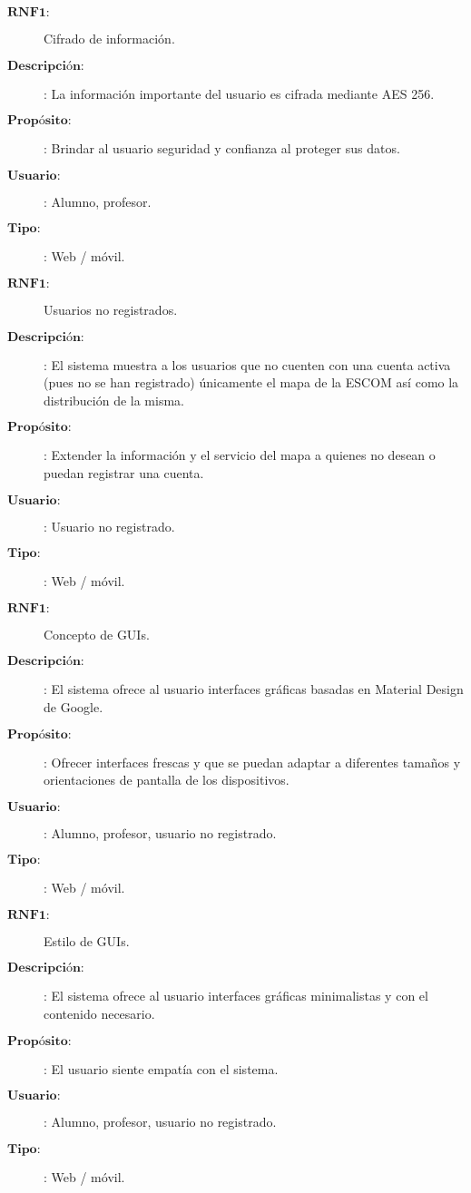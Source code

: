 \begin{description}
\item[$\textbf{RNF1:}$] Cifrado de información. 
\item[$\textbf{Descripción:}$]: La información importante del usuario es cifrada mediante AES 256.
\item[$\textbf{Propósito:}$]: Brindar al usuario seguridad y confianza al proteger sus datos. 
\item[$\textbf{Usuario:}$]: Alumno, profesor.
\item[$\textbf{Tipo:}$]: Web / móvil. \\

\item[$\textbf{RNF1:}$] Usuarios no registrados. 
\item[$\textbf{Descripción:}$]: El sistema muestra a los usuarios que no cuenten con una cuenta activa (pues no se han registrado) únicamente el mapa de la ESCOM así como la distribución de la misma.
\item[$\textbf{Propósito:}$]: Extender la información y el servicio del mapa a quienes no desean o puedan registrar una cuenta.
\item[$\textbf{Usuario:}$]: Usuario no registrado.  
\item[$\textbf{Tipo:}$]: Web / móvil. \\

\item[$\textbf{RNF1:}$] Concepto de GUIs. 
\item[$\textbf{Descripción:}$]: El sistema ofrece al usuario interfaces gráficas basadas en Material Design de Google.
\item[$\textbf{Propósito:}$]: Ofrecer interfaces frescas y que se puedan adaptar a diferentes tamaños y orientaciones de pantalla de los dispositivos. 
\item[$\textbf{Usuario:}$]: Alumno, profesor, usuario no registrado.  
\item[$\textbf{Tipo:}$]: Web / móvil. \\

\item[$\textbf{RNF1:}$] Estilo de GUIs. 
\item[$\textbf{Descripción:}$]: El sistema ofrece al usuario interfaces gráficas minimalistas y con el contenido necesario.
\item[$\textbf{Propósito:}$]: El usuario siente empatía con el sistema. 
\item[$\textbf{Usuario:}$]: Alumno, profesor, usuario no registrado.  
\item[$\textbf{Tipo:}$]: Web / móvil. \\


\end{description}
